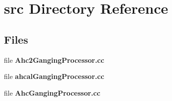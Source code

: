 \section{src Directory Reference}
\label{dir_1d782678e12b6b5d1cc8331f1076ad90}
\subsection*{Files}
\begin{DoxyCompactItemize}
\item 
file {\bfseries Ahc2\-Ganging\-Processor.\-cc}
\item 
file {\bfseries ahcal\-Ganging\-Processor.\-cc}
\item 
file {\bfseries Ahc\-Ganging\-Processor.\-cc}
\end{DoxyCompactItemize}
